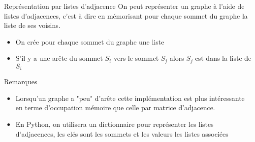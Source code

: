 \documentclass[10pt]{beamer}
\begin{document}
\begin{frame}
	\mframe{\GR}
	\begin{alertblock}{Représentation par listes d'adjacence}
		On peut représenter un graphe à l'aide de listes d'adjacences, c'est à dire en mémorisant pour chaque sommet du graphe la liste de ses voisins.
		\begin{itemize}[label=\textbullet]
			\item<2-> On crée pour chaque sommet du graphe une liste
			\item<3-> S'il y a une arête du sommet $S_i$ vers le sommet $S_j$ alors  $S_j$ est dans la liste de $S_i$
		\end{itemize}
	\end{alertblock}
	\begin{block}{Remarques}
		\begin{itemize}[label=\textbullet]
			\item<5-> Lorsqu'un graphe a "peu" d'arête cette implémentation est plus intéressante en terme d'occupation mémoire que celle par matrice d'adjacence.
			\item<6-> En Python, on utilisera un dictionnaire pour représenter les listes d'adjacences, les clés sont les sommets et les valeurs les listes associées
		\end{itemize}
	\end{block}
\end{frame}
\end{document}
